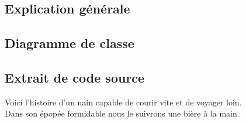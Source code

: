 \subsection{Explication générale}

\subsection{Diagramme de classe}

\subsection{Extrait de code source}
Voici l'histoire d'un nain capable de courir vite et de voyager loin.\\
Dans son épopée formidable nous le suivrons une bière à la main.\\